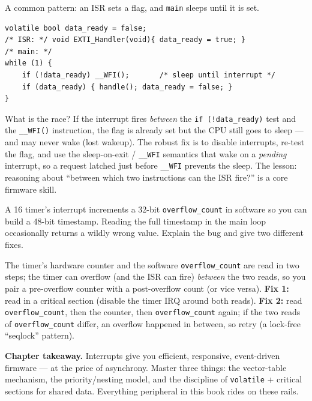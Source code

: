 \documentclass[11pt,a4paper,oneside]{book}
\newcommand{\code}[1]{\texttt{#1}}
\begin{document}
\begin{wexample}
A common pattern: an ISR sets a flag, and \code{main} sleeps until it is set.
\begin{lstlisting}
volatile bool data_ready = false;
/* ISR: */ void EXTI_Handler(void){ data_ready = true; }
/* main: */
while (1) {
    if (!data_ready) __WFI();       /* sleep until interrupt */
    if (data_ready) { handle(); data_ready = false; }
}
\end{lstlisting}
What is the race? If the interrupt fires \emph{between} the \code{if
(!data\_ready)} test and the \code{\_\_WFI()} instruction, the flag is already
set but the CPU still goes to sleep --- and may never wake (lost wakeup). The
robust fix is to disable interrupts, re-test the flag, and use the
sleep-on-exit / \code{\_\_WFI} semantics that wake on a \emph{pending}
interrupt, so a request latched just before \code{\_\_WFI} prevents the sleep.
The lesson: reasoning about ``between which two instructions can the ISR fire?''
is a core firmware skill.
\end{wexample}

\begin{exercise}
A \qty{16}{\bit} timer's interrupt increments a 32-bit \code{overflow\_count} in
software so you can build a 48-bit timestamp. Reading the full timestamp in the
main loop occasionally returns a wildly wrong value. Explain the bug and give
two different fixes.
\end{exercise}
\begin{solution}
The timer's hardware counter and the software \code{overflow\_count} are read in
two steps; the timer can overflow (and the ISR can fire) \emph{between} the two
reads, so you pair a pre-overflow counter with a post-overflow count (or vice
versa). \textbf{Fix 1:} read in a critical section (disable the timer IRQ around
both reads). \textbf{Fix 2:} read \code{overflow\_count}, then the counter, then
\code{overflow\_count} again; if the two reads of \code{overflow\_count} differ,
an overflow happened in between, so retry (a lock-free ``seqlock'' pattern).
\end{solution}

\begin{keyidea}
\textbf{Chapter takeaway.} Interrupts give you efficient, responsive,
event-driven firmware --- at the price of asynchrony. Master three things:
the vector-table mechanism, the priority/nesting model, and the discipline of
\code{volatile} + critical sections for shared data. Everything peripheral in
this book rides on these rails.
\end{keyidea}
\end{document}
